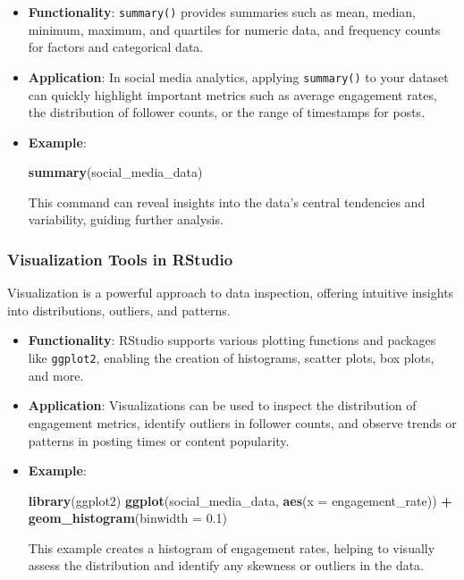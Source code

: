 \documentclass[
]{book}
\newenvironment{Shaded}{\begin{snugshade}}{\end{snugshade}}
\newcommand{\AttributeTok}[1]{\textcolor[rgb]{0.13,0.29,0.53}{#1}}
\newcommand{\FloatTok}[1]{\textcolor[rgb]{0.00,0.00,0.81}{#1}}
\newcommand{\FunctionTok}[1]{\textcolor[rgb]{0.13,0.29,0.53}{\textbf{#1}}}
\newcommand{\NormalTok}[1]{#1}
\newcommand{\SpecialCharTok}[1]{\textcolor[rgb]{0.81,0.36,0.00}{\textbf{#1}}}
\begin{document}
\begin{itemize}
\item
  \textbf{Functionality}: \texttt{summary()} provides summaries such as mean, median, minimum, maximum, and quartiles for numeric data, and frequency counts for factors and categorical data.
\item
  \textbf{Application}: In social media analytics, applying \texttt{summary()} to your dataset can quickly highlight important metrics such as average engagement rates, the distribution of follower counts, or the range of timestamps for posts.
\item
  \textbf{Example}:

\begin{Shaded}
\begin{Highlighting}[]
\FunctionTok{summary}\NormalTok{(social\_media\_data)}
\end{Highlighting}
\end{Shaded}

  This command can reveal insights into the data's central tendencies and variability, guiding further analysis.
\end{itemize}

\hypertarget{visualization-tools-in-rstudio}{%
\subsubsection{Visualization Tools in RStudio}\label{visualization-tools-in-rstudio}}

Visualization is a powerful approach to data inspection, offering intuitive insights into distributions, outliers, and patterns.

\begin{itemize}
\item
  \textbf{Functionality}: RStudio supports various plotting functions and packages like \texttt{ggplot2}, enabling the creation of histograms, scatter plots, box plots, and more.
\item
  \textbf{Application}: Visualizations can be used to inspect the distribution of engagement metrics, identify outliers in follower counts, and observe trends or patterns in posting times or content popularity.
\item
  \textbf{Example}:

\begin{Shaded}
\begin{Highlighting}[]
\FunctionTok{library}\NormalTok{(ggplot2)}
\FunctionTok{ggplot}\NormalTok{(social\_media\_data, }\FunctionTok{aes}\NormalTok{(}\AttributeTok{x =}\NormalTok{ engagement\_rate)) }\SpecialCharTok{+} \FunctionTok{geom\_histogram}\NormalTok{(}\AttributeTok{binwidth =} \FloatTok{0.1}\NormalTok{)}
\end{Highlighting}
\end{Shaded}

  This example creates a histogram of engagement rates, helping to visually assess the distribution and identify any skewness or outliers in the data.
\end{itemize}
\end{document}
